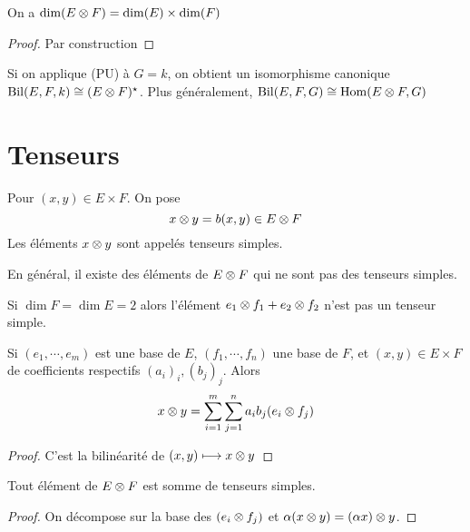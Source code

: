 \begin{prop}
    On a $\dim(E\otimes F)=\dim(E)\times \dim(F)$
\end{prop}

\begin{proof}
Par construction
\end{proof}

\begin{rem}
    Si on applique (PU) à $G=k$, on obtient un isomorphisme canonique  $\mathrm {Bil}(E, F, k) \cong (E\otimes F)^\star $. Plus généralement, $\mathrm {Bil}(E, F, G)\cong \mathrm {Hom}(E\otimes F, G)$
\end{rem}

\section{Tenseurs}

\begin{dfn}
    Pour $(x, y) \in  E\times F$. On pose \[
        x\otimes y=b(x, y) \in  E\otimes F
    \] 
    Les éléments $x\otimes y$ sont appelés tenseurs simples.
\end{dfn}

\begin{rem}
En général, il existe des éléments de $E\otimes F$ qui ne sont pas des tenseurs simples.
\end{rem}

\begin{exo}
Si $\dim F=\dim E=2$ alors l'élément  $e_1\otimes f_1+e_2\otimes f_2$ n'est pas un tenseur simple.
\end{exo}

\begin{prop}
    Si $(e_1, \cdots , e_m)$ est une base de $E$,  $(f_1, \cdots , f_n)$ une base de $F$,  et $(x, y) \in  E\times F$ de coefficients respectifs $(a_i)_i, (b_j)_j$. Alors  \[
        x\otimes y= \sum_{i=1}^{m} \sum_{j=1}^{n} a_ib_j(e_i\otimes f_j)
    \] 
\end{prop}

\begin{proof}
    C'est la bilinéarité de $(x, y)\longmapsto x\otimes y$
\end{proof}

\begin{prop}
Tout élément de $E\otimes F$ est somme de tenseurs simples.
\end{prop}

\begin{proof}
    On décompose sur la base des $(e_i\otimes f_j)$ et  $\alpha (x\otimes y)=(\alpha x)\otimes y$.
\end{proof}

